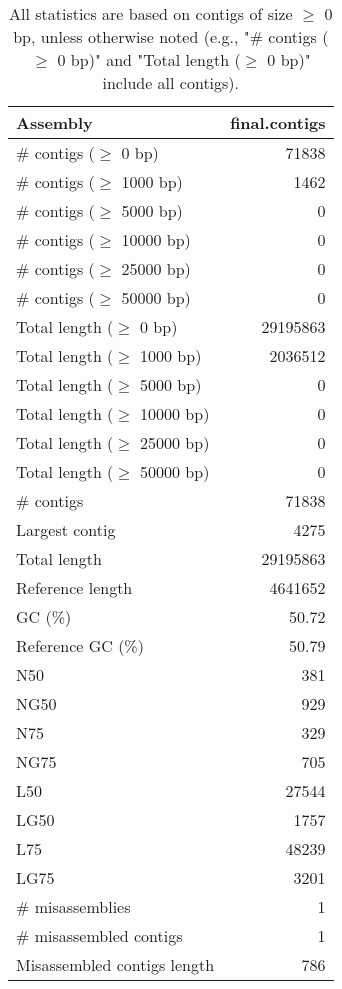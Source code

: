 \documentclass[12pt,a4paper]{article}
\begin{document}
\begin{table}[ht]
\begin{center}
\caption{All statistics are based on contigs of size $\geq$ 0 bp, unless otherwise noted (e.g., "\# contigs ($\geq$ 0 bp)" and "Total length ($\geq$ 0 bp)" include all contigs).}
\begin{tabular}{|l*{1}{|r}|}
\hline
Assembly & final.contigs \\ \hline
\# contigs ($\geq$ 0 bp) & 71838 \\ \hline
\# contigs ($\geq$ 1000 bp) & 1462 \\ \hline
\# contigs ($\geq$ 5000 bp) & 0 \\ \hline
\# contigs ($\geq$ 10000 bp) & 0 \\ \hline
\# contigs ($\geq$ 25000 bp) & 0 \\ \hline
\# contigs ($\geq$ 50000 bp) & 0 \\ \hline
Total length ($\geq$ 0 bp) & 29195863 \\ \hline
Total length ($\geq$ 1000 bp) & 2036512 \\ \hline
Total length ($\geq$ 5000 bp) & 0 \\ \hline
Total length ($\geq$ 10000 bp) & 0 \\ \hline
Total length ($\geq$ 25000 bp) & 0 \\ \hline
Total length ($\geq$ 50000 bp) & 0 \\ \hline
\# contigs & 71838 \\ \hline
Largest contig & 4275 \\ \hline
Total length & 29195863 \\ \hline
Reference length & 4641652 \\ \hline
GC (\%) & 50.72 \\ \hline
Reference GC (\%) & 50.79 \\ \hline
N50 & 381 \\ \hline
NG50 & 929 \\ \hline
N75 & 329 \\ \hline
NG75 & 705 \\ \hline
L50 & 27544 \\ \hline
LG50 & 1757 \\ \hline
L75 & 48239 \\ \hline
LG75 & 3201 \\ \hline
\# misassemblies & 1 \\ \hline
\# misassembled contigs & 1 \\ \hline
Misassembled contigs length & 786 \\ \hline

\end{tabular}
\end{center}
\end{table}
\end{document}
